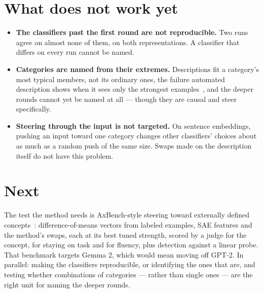 \documentclass[11pt]{article}
\begin{document}
\section*{What does not work yet}

\begin{itemize}
\item \textbf{The classifiers past the first round are not reproducible.}
Two runs agree on almost none of them, on both representations. A
classifier that differs on every run cannot be named.
\item \textbf{Categories are named from their extremes.} Descriptions fit a
category's most typical members, not its ordinary ones, the failure
automated description shows when it sees only the strongest
examples~\cite{paulo2025}, and the deeper
rounds cannot yet be named at all --- though they are causal and steer
specifically.
\item \textbf{Steering through the input is not targeted.} On sentence
embeddings, pushing an input toward one category changes other
classifiers' choices about as much as a random push of the same size.
Swaps made on the description itself do not have this problem.
\end{itemize}

\section*{Next}

The test the method needs is AxBench-style steering toward externally
defined concepts~\cite{wu2025axbenchsteeringllmssimple}:
difference-of-means vectors from labeled examples, SAE features and the
method's swaps, each at its best tuned strength, scored by a judge for
the concept, for staying on task and for fluency, plus detection against
a linear probe.
That benchmark targets Gemma 2, which would mean moving off GPT-2. In
parallel: making the classifiers reproducible, or identifying the ones
that are, and testing whether combinations of categories --- rather than
single ones --- are the right unit for naming the deeper rounds.

\printbibliography
\end{document}
